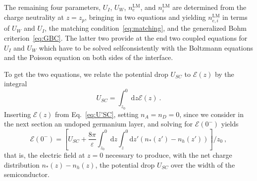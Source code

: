\documentclass[pre,reprint,floats]{revtex4-1}
\newcommand{\rmd}{\ensuremath{\mathrm{d}}}
\begin{document}
The remaining four parameters, $U_I$, $U_W$, $n_e^\mathrm{LM}$, and $n_i^\mathrm{LM}$ are determined
from the charge neutrality at $z=z_p$, bringing in two equations and yielding $n_{e,i}^\mathrm{LM}$ 
in terms of $U_W$ and $U_I$, the matching condition~\eqref{eq:matching}, and the generalized Bohm 
criterion~\eqref{eq:GBC}. The latter two provide at the end two coupled equations for $U_I$ and $U_W$ 
which have to be solved selfconsistently with the Boltzmann equations and the Poisson equation on
both sides of the interface.

To get the two equations, we relate the potential drop $U_{SC}$ to $\mathcal{E}(z)$ by the 
integral
\begin{equation}\label{eq:U_SC}
U_{SC} = \int_{z_0}^{0}\rmd z \mathcal{E}(z)~.
\end{equation}
Inserting $\mathcal{E}(z)$ from Eq.~\eqref{eq:U'SC}, setting $n_A=n_D=0$, since we consider in the next 
section an undoped germanium layer, and solving for $\mathcal{E}(0^-)$ yields
\begin{equation}
\label{E_left}
\mathcal{E}(0^-) = \left[ U_{SC} + 
\frac{8\pi}{\varepsilon}\int_{z_0}^{0}\rmd z\int_{z}^{0}\rmd z'(n_*(z')-n_h(z'))\right]/z_0~,
\end{equation}
that is, the electric field at $z=0$ necessary to produce, with the net charge distribution $n_*(z)-n_h(z)$, 
the potential drop $U_{SC}$ over the width of the semiconductor. 
\end{document}
